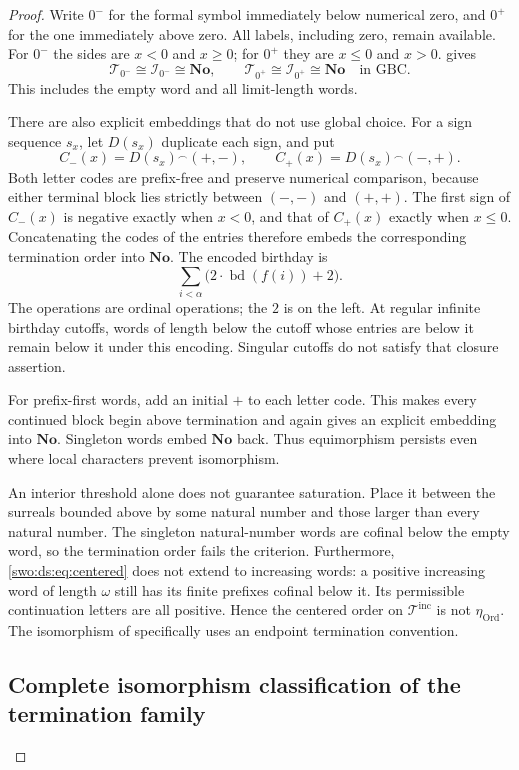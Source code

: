 \documentclass[11pt]{article}
\theoremstyle{definition}
\theoremstyle{remark}
\newcommand{\No}{\mathbf{No}}
\newcommand{\Ord}{\mathrm{Ord}}
\newcommand{\Words}{\mathcal I}
\newcommand{\WordsAll}{\mathcal T}
\newcommand{\bd}{\operatorname{bd}}
\newcommand{\cat}{\mathbin{{}^\frown}}
\newcommand{\WordsInc}{\mathcal T^{\mathrm{inc}}}
\begin{document}
\begin{proof}
Write $0^-$ for the formal symbol immediately below numerical zero, and
$0^+$ for the one immediately above zero. All labels, including zero,
remain available. For $0^-$ the sides are $x<0$ and $x\ge0$; for $0^+$
they are $x\le0$ and $x>0$.  gives
\[
 \WordsAll_{0^-}\cong \Words_{0^-}\cong\No,
 \qquad
 \WordsAll_{0^+}\cong \Words_{0^+}\cong\No
 \quad\text{in GBC}.
\tag{S16.6}\label{swo:ds:eq:centered}
\]
This includes the empty word and all limit-length words.

There are also explicit embeddings that do not use global choice. For a
sign sequence $s_x$, let $D(s_x)$ duplicate each sign, and put
\[
 C_-(x)=D(s_x)\cat(+,-),\qquad
 C_+(x)=D(s_x)\cat(-,+).
\]
Both letter codes are prefix-free and preserve numerical comparison,
because either terminal block lies strictly between $(-,-)$ and $(+,+)$.
The first sign of $C_-(x)$ is negative exactly when $x<0$, and that of
$C_+(x)$ exactly when $x\le0$. Concatenating the codes of the entries
therefore embeds the corresponding termination order into $\No$.
The encoded birthday is
\[
 \sum_{i<\alpha}\bigl(2\cdot\bd(f(i))+2\bigr).
\tag{S16.7}\label{swo:ds:eq:centeredbirthday}
\]
The operations are ordinal operations; the $2$ is on the left.
At regular infinite birthday cutoffs, words of length below the cutoff
whose entries are below it remain below it under this encoding.
Singular cutoffs do not satisfy that closure assertion.

For prefix-first words, add an initial $+$ to each letter code. This
makes every continued block begin above termination and again gives an
explicit embedding into $\No$. Singleton words embed $\No$ back. Thus
equimorphism persists even where local characters prevent isomorphism.

An interior threshold alone does not guarantee saturation. Place it
between the surreals bounded above by some natural number and those
larger than every natural number. The singleton natural-number words are
cofinal below the empty word, so the termination order fails the criterion.
Furthermore, \eqref{swo:ds:eq:centered} does not extend to increasing words:
a positive increasing word of length $\omega$ still has its finite
prefixes cofinal below it. Its permissible continuation letters are all
positive. Hence the centered order on $\WordsInc$ is not $\eta_{\Ord}$.
The isomorphism of  specifically uses
an endpoint termination convention.

\subsection{Complete isomorphism classification of the termination family}


\end{proof}
\end{document}

